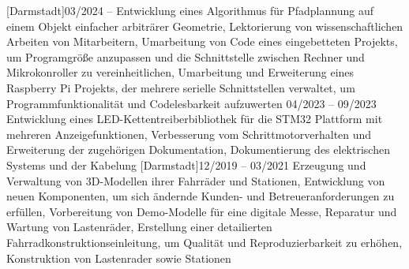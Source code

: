 \documentclass[
	themeColor=blue,
	lang=DE,
	titleStyle=1,
	jobExpStyle=1,
	eduStyle=1
]{../templates/cv_res}
\begin{document}
\maketitle

	[Darmstadt]{03/2024 -- }{%
	{Entwicklung eines Algorithmus für Pfadplannung auf einem Objekt einfacher arbiträrer Geometrie},
	{Lektorierung von wissenschaftlichen Arbeiten von Mitarbeitern},
	{Umarbeitung von Code eines eingebetteten Projekts, um Programgröße anzupassen und die Schnittstelle zwischen Rechner und Mikrokonroller zu vereinheitlichen},
	{Umarbeitung und Erweiterung eines Raspberry Pi Projekts, der mehrere serielle Schnittstellen verwaltet, um Programmfunktionalität und Codelesbarkeit aufzuwerten}
}
{04/2023 -- 09/2023}{%
	{Entwicklung eines LED-Kettentreiberbibliothek für die STM32 Plattform mit mehreren Anzeigefunktionen},
	{Verbesserung vom Schrittmotorverhalten und Erweiterung der zugehörigen Dokumentation},
	{Dokumentierung des elektrischen Systems und der Kabelung}
}
[Darmstadt]{12/2019 -- 03/2021}{%
  {Erzeugung und Verwaltung von 3D-Modellen ihrer Fahrräder und Stationen},
  {Entwicklung von neuen Komponenten, um sich ändernde Kunden- und Betreueranforderungen zu erfüllen},
  {Vorbereitung von Demo-Modelle für eine digitale Messe},
  {Reparatur und Wartung von Lastenräder},
  {Erstellung einer detailierten Fahrradkonstruktionseinleitung, um Qualität und Reproduzierbarkeit zu erhöhen},
  {Konstruktion von Lastenrader sowie Stationen}
}
\end{document}
